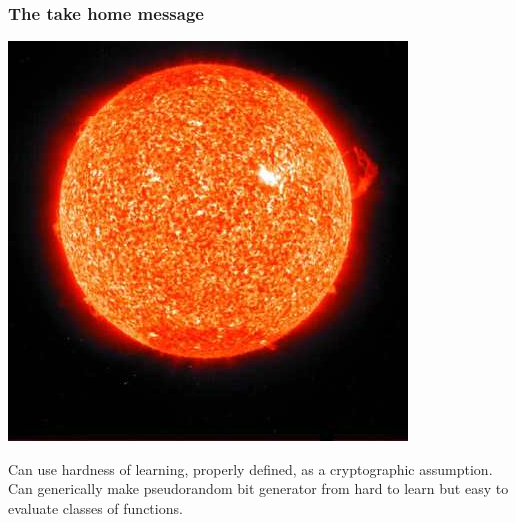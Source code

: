 \documentclass{beamer}
\begin{document}
\begin{frame}
\frametitle{The take home message}
\includegraphics[scale=.25]{images/sun.jpg}
\begin{itemize}
\pitem Can use hardness of learning, properly defined, as a cryptographic assumption.
\pitem Can generically make pseudorandom bit generator from hard to learn but easy to evaluate classes of functions.
\end{itemize}
\end{frame}
\end{document}
